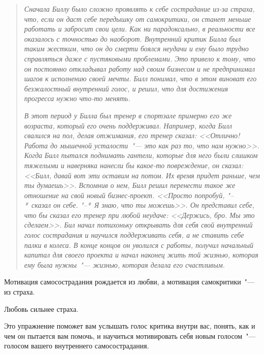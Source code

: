 \begin{quotation}
	\textit{
		Сначала Биллу было сложно проявлять к себе сострадание из-за страха, что, если он даст себе передышку от самокритики, он станет меньше работать и забросит свои цели. Как ни парадоксально, в реальности все оказалось с точностью до наоборот. Внутренний критик Билла был таким жестким, что он до смерти боялся неудачи и ему было трудно справляться даже с пустяковыми проблемами. Это привело к тому, что он постоянно откладывал работу над своим бизнесом и не предпринимал шагов к исполнению своей мечты. Билл понимал, что в этом виноват его безжалостный внутренний голос, и решил, что для достижения прогресса нужно что-то менять.
	}
	
	\textit{
		В этот период у Билла был тренер в спортзале примерно его же возраста, который его очень поддерживал. Например, когда Билл свалился на пол, делая отжимания, его тренер сказал: <<Отлично! Работа до мышечной усталости~"--- это как раз то, что нам нужно>>. Когда Билл пытался поднимать гантели, которые для него были слишком тяжелыми и наверняка нанесли бы какое-то повреждение, он сказал: <<Билл, давай вот эти оставим на потом. Их время придет раньше, чем ты думаешь>>. Вспомнив о нем, Билл решил перенести такое же отношение на свой новый бизнес-проект. <<Просто попробуй, "--*~сказал он себе. "--*~Я знаю, что ты можешь>>. Он представил себе, что бы сказал его тренер при любой неудаче: <<Держись, бро. Мы это сделаем>>. Бил начал потихоньку открывать для себя свой внутренний голос сострадания и научился поддерживать себя, а не ставить себе палки в колеса. В конце концов он уволился с работы, получил начальный капитал для своего проекта и начал наконец жить той жизнью, которая ему была нужны~"--- жизнью, которая делала его счастливым.
	}
\end{quotation}

\vspace{3ex}

\begin{center}
	{\Large Мотивация самосострадания рождается из любви, а мотивация самокритики~"--- из страха.}
	
	\vspace{1ex}
	
	{\Large	Любовь сильнее страха.}
\end{center}

\newpage
{} \label{EX:Finding_Your_Compassionate_Voice}

Это упражнение поможет вам услышать голос критика внутри вас, понять, как и чем он пытается вам помочь, и научиться мотивировать себя новым голосом~"--- голосом вашего внутреннего самосострадания. 

